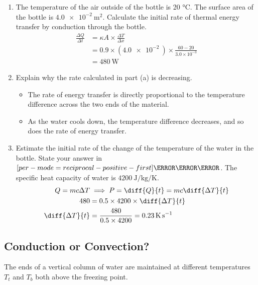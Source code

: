 \documentclass[a4paper,12pt]{article}
\let\oldsi\si
\renewcommand{\si}[1]{\oldsi[per-mode=reciprocal-positive-first]{#1}}
\begin{document}
\begin{enumerate}[label=(\alph*)]
  \item The temperature of the air outside of the bottle is 20 °C. The surface area of the bottle is $\SI{4.0e-2}{\m\squared}$. Calculate the initial rate of thermal energy transfer by conduction through the bottle.
        \begin{align*}
          \frac{\Delta Q}{\Delta t} & = \kappa A\times \frac{\Delta T}{\Delta x}                            \\
                                    & = 0.9 \times (\SI{4.0e-2}{})\times \frac{60 - 20}{3.0 \times 10^{-3}} \\
                                    & = \SI{480}{\W}
        \end{align*}
  \item Explain why the rate calculated in part (a) is decreasing.
        \begin{itemize}
          \item The rate of energy transfer is directly proportional to the temperature difference across the two ends of the material.
          \item As the water cools down, the temperature difference decreases, and so does the rate of energy transfer.
        \end{itemize}
  \item Estimate the initial rate of the change of the temperature of the water in the bottle. State your answer in $\si{\K\per\s}$. The specific heat capacity of water is $\SI{4200}{\joule\per\kilogram\per\kelvin}$.
        \begin{align*}
          Q = mc\Delta T     & \implies P = \diff{Q}{t} = mc\diff{\Delta T}{t}     \\
          480                & = 0.5 \times 4200 \times \diff{\Delta T}{t}         \\
          \diff{\Delta T}{t} & = \frac{480}{0.5 \times 4200} = \SI{0.23}{\K\per\s}
        \end{align*}
\end{enumerate}

\pagebreak

\subsection{Conduction or Convection?}

The ends of a vertical column of water are maintained at different temperatures $T_t$ and $T_b$ both above the freezing point.
\end{document}
